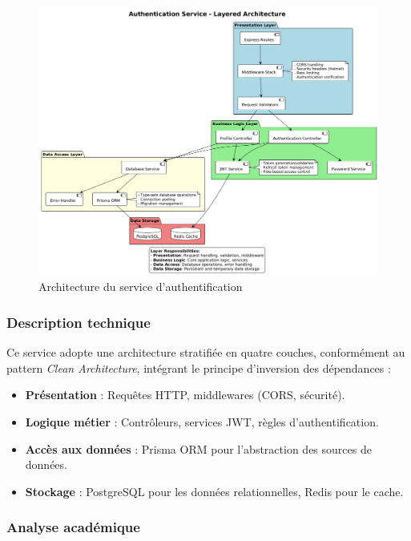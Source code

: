 \documentclass[12pt]{rapportPfe}
\begin{document}
\begin{figure}[H]
    \centering
    \includegraphics[width=1.1\textwidth]{diagrams/diagram2.png}
    \caption{Architecture du service d’authentification}
    \label{fig:diagram2}
\end{figure}

\subsubsection*{Description technique}

Ce service adopte une architecture stratifiée en quatre couches, conformément au pattern \textit{Clean Architecture}, intégrant le principe d’inversion des dépendances :

\begin{itemize}[label=--]
    \item \textbf{Présentation} : Requêtes HTTP, middlewares (CORS, sécurité).
    \item \textbf{Logique métier} : Contrôleurs, services JWT, règles d’authentification.
    \item \textbf{Accès aux données} : Prisma ORM pour l’abstraction des sources de données.
    \item \textbf{Stockage} : PostgreSQL pour les données relationnelles, Redis pour le cache.
\end{itemize}

\subsubsection*{Analyse académique}
\end{document}
